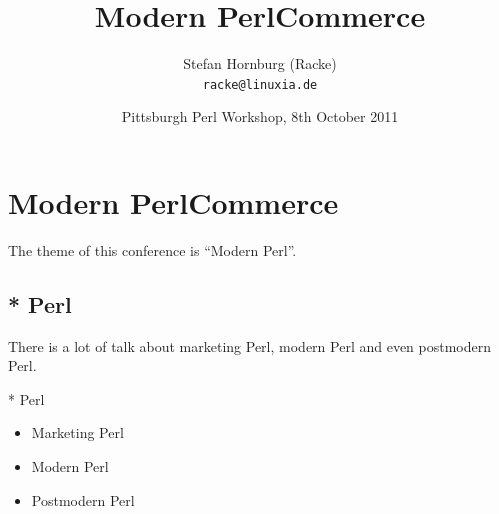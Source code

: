 
\usepackage[T1]{fontenc}
\usepackage{mathptmx}
\usepackage[scaled=.90]{helvet}
\usepackage{courier}

\usepackage{beamerthemesplit}
\usepackage{verbatim}
\usepackage{hyperref}
\usepackage{listings}
\lstset{language=Perl,basicstyle=\footnotesize,tabsize=3,showstringspaces=false}

\title{Modern PerlCommerce}
\author[racke]{Stefan Hornburg (Racke)\\ \texttt{racke@linuxia.de}}
\date[]{Pittsburgh Perl Workshop, 8th October 2011}


\maketitle{}

\begin{frame}
  \titlepage
\end{frame}

\tableofcontents


\section{Modern PerlCommerce}
The theme of this conference is ``Modern Perl''.

\subsection{* Perl}
There is a lot of talk about marketing Perl, modern Perl
and even postmodern Perl.

\begin{frame}{* Perl}
\begin{itemize}
\item Marketing Perl
\item Modern Perl
\item Postmodern Perl
\end{itemize}
\end{frame}


